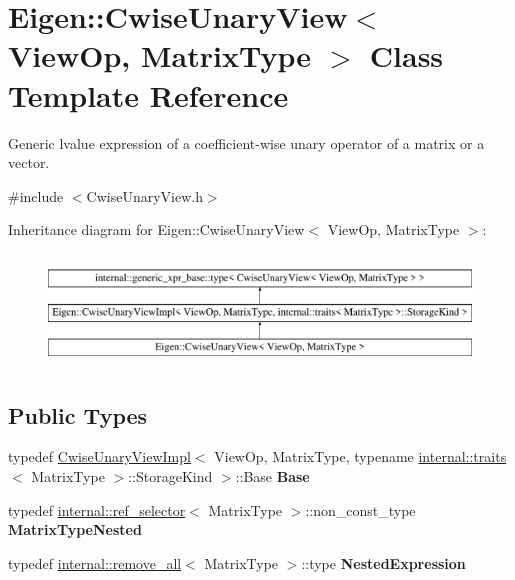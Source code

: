 \hypertarget{class_eigen_1_1_cwise_unary_view}{}\section{Eigen\+::Cwise\+Unary\+View$<$ View\+Op, Matrix\+Type $>$ Class Template Reference}
\label{class_eigen_1_1_cwise_unary_view}


Generic lvalue expression of a coefficient-\/wise unary operator of a matrix or a vector.  




{\ttfamily \#include $<$Cwise\+Unary\+View.\+h$>$}

Inheritance diagram for Eigen\+::Cwise\+Unary\+View$<$ View\+Op, Matrix\+Type $>$\+:\begin{figure}[H]
\begin{center}
\leavevmode
\includegraphics[height=2.984014cm]{class_eigen_1_1_cwise_unary_view}
\end{center}
\end{figure}
\subsection*{Public Types}
\begin{DoxyCompactItemize}
\item 
\mbox{\label{class_eigen_1_1_cwise_unary_view_a505263841437a9055a728640a8783500}} 
typedef \mbox{\hyperlink{class_eigen_1_1_cwise_unary_view_impl}{Cwise\+Unary\+View\+Impl}}$<$ View\+Op, Matrix\+Type, typename \mbox{\hyperlink{struct_eigen_1_1internal_1_1traits}{internal\+::traits}}$<$ Matrix\+Type $>$\+::Storage\+Kind $>$\+::Base {\bfseries Base}
\item 
\mbox{\label{class_eigen_1_1_cwise_unary_view_a6cec9334332dde27fb2f7469dbbd867a}} 
typedef \mbox{\hyperlink{struct_eigen_1_1internal_1_1ref__selector}{internal\+::ref\+\_\+selector}}$<$ Matrix\+Type $>$\+::non\+\_\+const\+\_\+type {\bfseries Matrix\+Type\+Nested}
\item 
\mbox{\label{class_eigen_1_1_cwise_unary_view_af1826ee451a9e0c2bada93e59ea2f3b1}} 
typedef \mbox{\hyperlink{struct_eigen_1_1internal_1_1remove__all}{internal\+::remove\+\_\+all}}$<$ Matrix\+Type $>$\+::type {\bfseries Nested\+Expression}
\end{DoxyCompactItemize}
